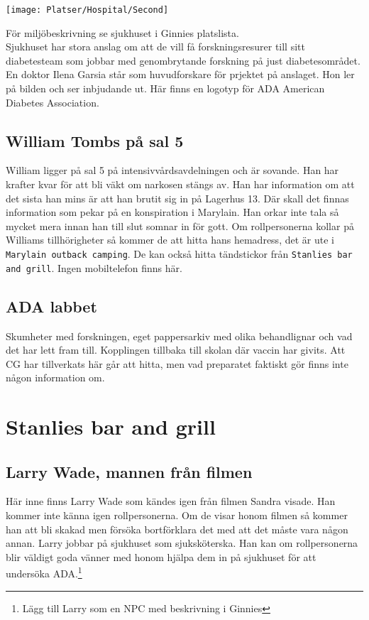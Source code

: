 \documentclass[a5paper,10pt]{report}
\begin{document}
\texttt{[image: Platser/Hospital/Second]}

För miljöbeskrivning se sjukhuset i Ginnies platslista.\\
Sjukhuset har stora anslag om att de vill få forskningsresurer till sitt diabetesteam som jobbar med genombrytande forskning på just diabetesområdet. En doktor Ilena Garsia står som huvudforskare för prjektet på anslaget. Hon ler på bilden och ser inbjudande ut. Här finns en logotyp för ADA American Diabetes Association.
\subsection{William Tombs på sal 5}
William ligger på sal 5 på intensivvårdsavdelningen och är sovande. Han har krafter kvar för att bli väkt om narkosen stängs av. Han har information om att det sista han mins är att han brutit sig in på Lagerhus 13. Där skall det finnas information som pekar på en konspiration i Marylain. Han orkar inte tala så mycket mera innan han till slut somnar in för gott. Om rollpersonerna kollar på Williams tillhörigheter så kommer de att hitta hans hemadress, det är ute i \texttt{Marylain outback camping}. De kan också hitta tändstickor från \texttt{Stanlies bar and grill}. Ingen mobiltelefon finns här.
\subsection{ADA labbet}
Skumheter med forskningen, eget pappersarkiv med olika behandlignar och vad det har lett fram till. Kopplingen tillbaka till skolan där vaccin har givits. Att CG har tillverkats här går att hitta, men vad preparatet faktiskt gör finns inte någon information om.
\section{Stanlies bar and grill}
\subsection{Larry Wade, mannen från filmen}
Här inne finns Larry Wade som kändes igen från filmen Sandra visade. Han kommer inte känna igen rollpersonerna. Om de visar honom filmen så kommer han att bli skakad men försöka bortförklara det med att det måste vara någon annan. Larry jobbar på sjukhuset som sjuksköterska. Han kan om rollpersonerna blir väldigt goda vänner med honom hjälpa dem in på sjukhuset för att undersöka ADA.\footnote{Lägg till Larry som en NPC med beskrivning i Ginnies}
\end{document}
